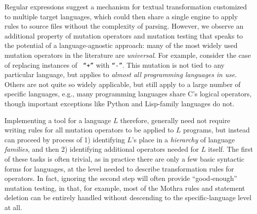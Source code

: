 \documentclass[acmsmall,screen,review,anonymous]{acmart}
\begin{document}
Regular expressions suggest a mechanism for textual transformation customized to
multiple target languages, which could then share a single engine to apply rules
to source files without the complexity of parsing. 
However, we observe an additional property of mutation operators and mutation
testing that speaks to the potential of a language-agnostic approach: many of the
most widely used mutation operators in the literature are \emph{universal}.  For
example, consider the case of replacing instances of {\tt
  ``+''}  with {\tt ``-''}.  This mutation is not tied to any
particular language, but applies to \emph{almost all programming
  languages in use.}  Others are not quite
so widely applicable, but still apply to a large number of specific
languages, e.g., many programming languages share C's logical
operators, though important exceptions like Python and Lisp-family
languages do not.

Implementing a tool for a language $L$ therefore, generally need not
require writing rules for all mutation operators to be applied to $L$
programs, but instead can proceed by process of 1) identifying $L$'s
place in a \emph{hierarchy} of language \emph{families}, and then 2)
identifying additional operators needed for $L$ itself.  The first of
these tasks is often trivial, as in practice there are only a few
basic syntactic forms for languages, at the level needed to describe
transformation rules for operators.  In fact, ignoring the second step
will often provide ``good-enough'' mutation testing, in that, for
example, most of the Mothra rules and statement deletion can be
entirely handled without descending to the specific-language level at all.
\end{document}
